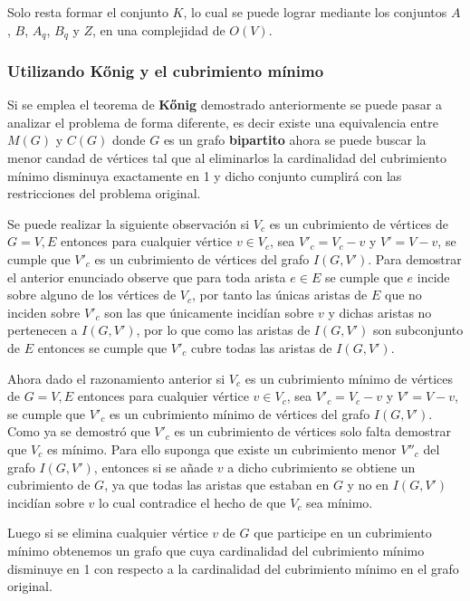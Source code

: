 \documentclass{article}
\begin{document}
Solo resta formar el conjunto $K$, lo cual se puede lograr mediante los conjuntos $A$, $B$, $A_q$, $B_q$ y $Z$, en una complejidad
de $O(V)$.

\subsubsection{Utilizando \textbf{Kőnig} y el cubrimiento mínimo}

Si se emplea el teorema de \textbf{Kőnig} demostrado anteriormente se puede pasar a analizar el problema de forma diferente,
es decir existe una equivalencia entre $M(G)$ y $C(G)$ donde $G$ es un grafo \textbf{bipartito} ahora se puede buscar
la menor candad de vértices tal que al eliminarlos la cardinalidad del cubrimiento mínimo disminuya exactamente en 1 y dicho conjunto cumplirá
con las restricciones del problema original.

Se puede realizar la siguiente observación si $V_c$ es un cubrimiento de vértices de $G = V, E$ entonces para cualquier vértice $v \in V_c$, sea $V'_c=V_c - v$
y $V'= V-v$, se cumple que $V'_c$ es un cubrimiento de vértices del grafo $I(G,V')$. Para demostrar el anterior enunciado observe que para toda arista $e\in E$ 
se cumple que $e$ incide sobre alguno de los vértices de $V_c$, por tanto las únicas aristas de
$E$ que no inciden sobre $V'_c$ son las que únicamente incidían sobre $v$ y dichas aristas no pertenecen a $I(G,V')$,
por lo que como las aristas de $I(G,V')$ son subconjunto de $E$ entonces se cumple que $V'_c$ cubre todas las aristas
de $I(G,V')$.

Ahora dado el razonamiento anterior si $V_c$ es un cubrimiento mínimo de vértices de $G = V, E$ entonces para cualquier vértice $v \in V_c$, sea $V'_c=V_c - v$
y $V'= V-v$, se cumple que $V'_c$ es un cubrimiento mínimo de vértices del grafo $I(G,V')$. Como ya se demostró que $V'_c$ es un cubrimiento de vértices
solo falta demostrar que $V_c$ es mínimo. Para ello suponga que existe un cubrimiento menor $V''_c$ del grafo $I(G,V')$, entonces si se añade $v$ a dicho
cubrimiento se obtiene un cubrimiento de $G$, ya que todas las aristas que estaban en $G$ y no en $I(G,V')$ incidían sobre
$v$ lo cual contradice el hecho de que $V_c$ sea mínimo.

Luego si se elimina cualquier vértice $v$ de $G$ que participe en un cubrimiento mínimo obtenemos un grafo que cuya cardinalidad del cubrimiento mínimo disminuye en 1
con respecto a la cardinalidad del cubrimiento mínimo en el grafo original.
\end{document}

